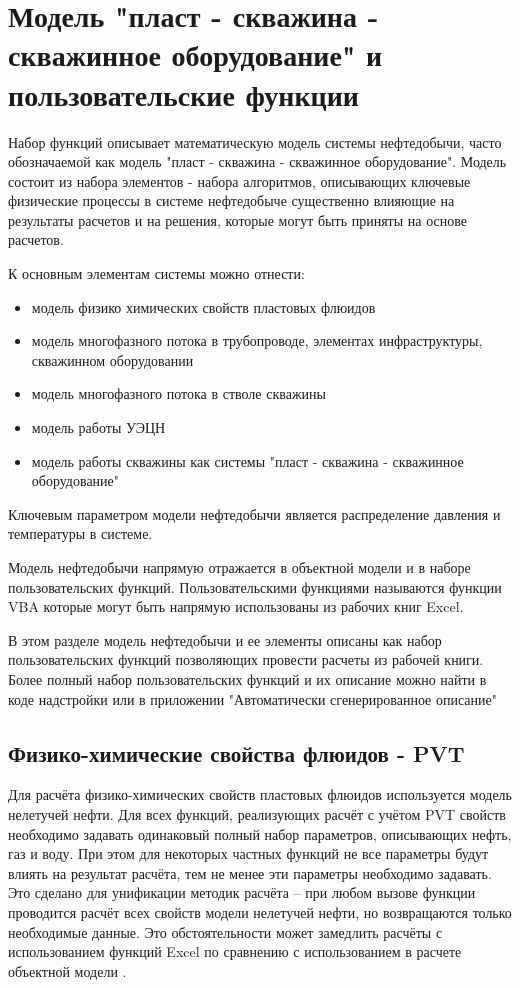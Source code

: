 \chapter{Модель "пласт - скважина - скважинное оборудование" и пользовательские функции \unf{}}
Набор функций \unf{} описывает математическую модель системы нефтедобычи, часто обозначаемой как модель "пласт - скважина - скважинное оборудование". Модель состоит из набора элементов - набора алгоритмов, описывающих ключевые физические процессы в системе нефтедобыче существенно влияющие на результаты расчетов и на решения, которые могут быть приняты на основе расчетов.

К основным элементам системы можно отнести:
\begin{itemize}
	\item модель физико химических свойств пластовых флюидов
	\item модель многофазного потока в трубопроводе, элементах инфраструктуры, скважинном оборудовании
	\item модель многофазного потока в стволе скважины
	\item модель работы УЭЦН
	\item модель работы скважины как системы "пласт - скважина - скважинное оборудование"
\end{itemize}

Ключевым параметром модели нефтедобычи является распределение давления и температуры в системе. 

Модель нефтедобычи напрямую отражается в объектной модели \unf{} и в наборе пользовательских функций. Пользовательскими функциями называются функции VBA которые могут быть напрямую использованы из рабочих книг Excel. 

В этом разделе модель нефтедобычи и ее элементы описаны как набор пользовательских функций позволяющих провести расчеты из рабочей книги. Более полный набор пользовательских функций и их описание можно найти в коде надстройки или в приложении "Автоматически сгенерированное описание"

\section{Физико-химические свойства флюидов - PVT}
Для расчёта физико-химических свойств пластовых флюидов используется модель нелетучей нефти. Для всех функций, реализующих расчёт с учётом PVT свойств необходимо задавать одинаковый полный набор параметров, описывающих нефть, газ и воду.  При этом для некоторых частных функций не все параметры будут влиять на результат расчёта, тем не менее эти параметры необходимо задавать. Это сделано для унификации методик расчёта – при любом вызове функции проводится расчёт всех свойств модели нелетучей нефти, но возвращаются только необходимые данные. Это обстоятельности может замедлить расчёты с использованием функций Excel по сравнению с использованием в расчете объектной модели \unf{}.
 
